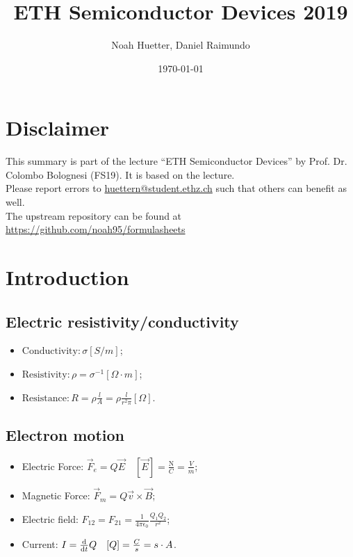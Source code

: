 \documentclass[a4paper, fontsize=8pt, landscape, DIV=1]{scrartcl}
\title{ETH Semiconductor Devices 2019}
\author{Noah Huetter, Daniel Raimundo}
\date{\today}
\begin{document}
\setcounter{secnumdepth}{2} %
\begin{multicols*}{4}
	\section*{Disclaimer}
	This summary is part of the lecture ``ETH Semiconductor Devices'' by Prof. Dr. Colombo Bolognesi (FS19). It is based on the lecture. \\[6pt]
	Please report errors to \href{mailto:huettern@student.ethz.ch}{huettern@student.ethz.ch} such that others can benefit as well.\\[6pt]	
  The upstream repository can be found at \href{https://github.com/noah95/formulasheets}{https://github.com/noah95/formulasheets}
	\vfill\null
	\pagebreak
  \thispagestyle{fancy}

  \section{Introduction}
  \setcounter{page}{1}
    \subsection{Electric resistivity/conductivity}
    \begin{itemize}[noitemsep,nolistsep]
       \item$\text{Conductivity}: \sigma \left[S/m\right]$;
       \item$\text{Resistivity}: \rho=\sigma^{-1} \left[\Omega\cdot m\right]$;
       \item$\text{Resistance}: R=\rho\frac{l}{A}=\rho\frac{l}{r^2\pi} \left[\Omega\right]$.
	\end{itemize}

    \subsection{Electron motion}
    \begin{itemize}[noitemsep,nolistsep]
      \item Electric Force: $\vec{F}_e = Q\vec{E} \quad [\vec{E}]=\frac{\text{N}}{C}=\frac{V}{m}$;
      \item Magnetic Force:
        $\vec{F}_m = Q\vec{v}\times\vec{B}$;
      \item Electric field: $F_{12}=F_{21}=\frac{1}{4\pi\epsilon_0}\frac{Q_1Q_2}{r^2}$;
      \item Current: $I = \frac{\mathrm{d}}{\mathrm{d}t}Q \quad [Q]=\frac{C}{s}={s\cdot A}$.
    \end{itemize}


\end{multicols*}
\end{document}
